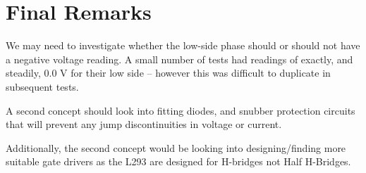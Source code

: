 \documentclass[a4paper]{article}
\begin{document}
\section{Final Remarks}
We may need to investigate whether the low-side phase should or should not have
a negative voltage reading. A small number of tests had readings of exactly, and
steadily, 0.0 V for
their low side -- however this was difficult to duplicate in subsequent tests.

A second concept should look into fitting diodes, and snubber protection
circuits that will prevent any jump discontinuities in voltage or current.

Additionally, the second concept would be looking into designing/finding more
suitable gate drivers as the L293 are designed for H-bridges not Half H-Bridges.
\end{document}
